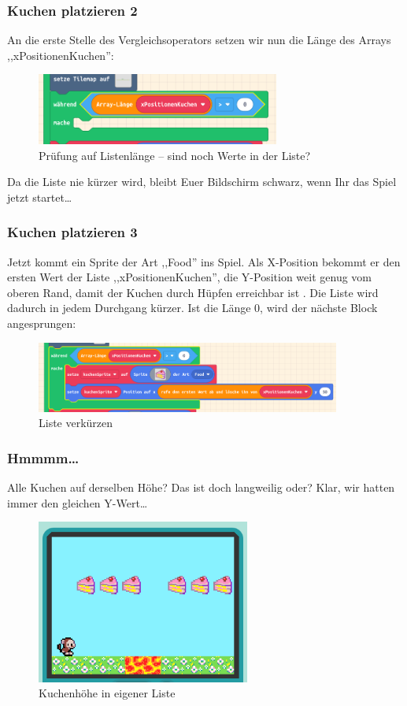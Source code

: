 \documentclass{beamer}
\begin{document}
\begin{frame}
 \frametitle{Kuchen platzieren 2}
 
An die erste Stelle des Vergleichsoperators setzen wir nun die Länge des Arrays ,,xPositionenKuchen'': 

\begin{figure}
  \includegraphics[width=8cm]{game43.png}
  \caption{Prüfung auf Listenlänge – sind noch Werte in der Liste?}
  \label{fig:game43}
\end{figure}

Da die Liste nie kürzer wird, bleibt Euer Bildschirm schwarz, wenn Ihr das Spiel jetzt startet…

\end{frame}

\begin{frame}
 \frametitle{Kuchen platzieren 3}
 
Jetzt kommt ein Sprite der Art ,,Food'' ins Spiel. Als X-Position bekommt er den ersten Wert der Liste ,,xPositionenKuchen'', die Y-Position weit genug vom oberen Rand, damit der Kuchen durch Hüpfen erreichbar ist . Die Liste wird dadurch in jedem Durchgang kürzer. Ist die Länge 0, wird der nächste Block angesprungen: 
 
\begin{figure}
  \includegraphics[width=10cm]{game44.png}
  \caption{Liste verkürzen}
  \label{fig:game44}
\end{figure}
\end{frame}

\begin{frame}
 \frametitle{Hmmmm…}
 
 Alle Kuchen auf derselben Höhe? Das ist doch langweilig oder? Klar, wir hatten immer den gleichen Y-Wert…
 
\begin{figure}
  \includegraphics[width=7cm]{game45.png}
  \caption{Kuchenhöhe in eigener Liste}
  \label{fig:game45}
\end{figure}
\end{frame}
\end{document}
